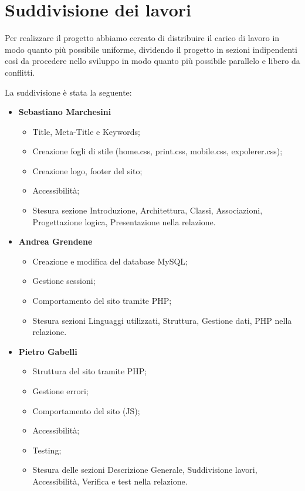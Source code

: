 \section{Suddivisione dei lavori}{
	Per realizzare il progetto abbiamo cercato di distribuire il carico di lavoro in modo quanto più possibile uniforme, dividendo il progetto in sezioni indipendenti così da procedere nello sviluppo in modo quanto più possibile parallelo e libero da conflitti.
	
	La suddivisione è stata la seguente: 	
	\begin{itemize}\itemsep1pt
		\item \textbf{Sebastiano Marchesini} 
		\begin{itemize}\itemsep1pt
			\item Title, Meta-Title e Keywords;
			\item Creazione fogli di stile (home.css, print.css, mobile.css, expolerer.css);
			\item Creazione logo, footer del sito;
			\item Accessibilità;
			\item Stesura sezione Introduzione, Architettura, Classi, Associazioni, Progettazione logica, Presentazione nella relazione.
		\end{itemize}
		\item \textbf{Andrea Grendene}
		\begin{itemize}\itemsep1pt
			\item Creazione e modifica del database MySQL;
			\item Gestione sessioni;
			\item Comportamento del sito tramite PHP;
			\item Stesura sezioni Linguaggi utilizzati, Struttura, Gestione dati, PHP nella relazione.
		\end{itemize}
		\item \textbf{Pietro Gabelli}
		\begin{itemize}\itemsep1pt
			\item Struttura del sito tramite PHP;
			\item Gestione errori;
			\item Comportamento del sito (JS);
			\item Accessibilità;
			\item Testing;
			\item Stesura delle sezioni Descrizione Generale, Suddivisione lavori, Accessibilità, Verifica e test nella relazione.
		\end{itemize}
	\end{itemize}
}